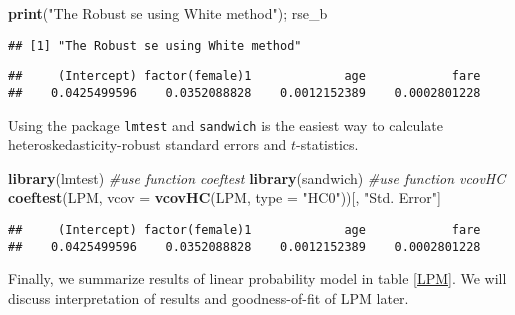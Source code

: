 \documentclass[
  12pt,
]{article}
\newenvironment{Shaded}{\begin{snugshade}}{\end{snugshade}}
\newcommand{\CommentTok}[1]{\textcolor[rgb]{0.56,0.35,0.01}{\textit{#1}}}
\newcommand{\DataTypeTok}[1]{\textcolor[rgb]{0.13,0.29,0.53}{#1}}
\newcommand{\KeywordTok}[1]{\textcolor[rgb]{0.13,0.29,0.53}{\textbf{#1}}}
\newcommand{\NormalTok}[1]{#1}
\newcommand{\StringTok}[1]{\textcolor[rgb]{0.31,0.60,0.02}{#1}}
\begin{document}
\begin{Shaded}
\begin{Highlighting}[]
\KeywordTok{print}\NormalTok{(}\StringTok{"The Robust se using White method"}\NormalTok{); rse\_b}
\end{Highlighting}
\end{Shaded}

\begin{verbatim}
## [1] "The Robust se using White method"
\end{verbatim}

\begin{verbatim}
##     (Intercept) factor(female)1             age            fare 
##    0.0425499596    0.0352088828    0.0012152389    0.0002801228
\end{verbatim}

Using the package \texttt{lmtest} and \texttt{sandwich} is the easiest
way to calculate heteroskedasticity-robust standard errors and
\(t\)-statistics.

\begin{Shaded}
\begin{Highlighting}[]
\KeywordTok{library}\NormalTok{(lmtest) }\CommentTok{\#use function \textasciigrave{}coeftest\textasciigrave{}}
\KeywordTok{library}\NormalTok{(sandwich) }\CommentTok{\#use function \textasciigrave{}vcovHC\textasciigrave{}}
\KeywordTok{coeftest}\NormalTok{(LPM, }\DataTypeTok{vcov =} \KeywordTok{vcovHC}\NormalTok{(LPM, }\DataTypeTok{type =} \StringTok{"HC0"}\NormalTok{))[, }\StringTok{"Std. Error"}\NormalTok{]}
\end{Highlighting}
\end{Shaded}

\begin{verbatim}
##     (Intercept) factor(female)1             age            fare 
##    0.0425499596    0.0352088828    0.0012152389    0.0002801228
\end{verbatim}

Finally, we summarize results of linear probability model in table
\ref{LPM}. We will discuss interpretation of results and goodness-of-fit
of LPM later.
\end{document}
